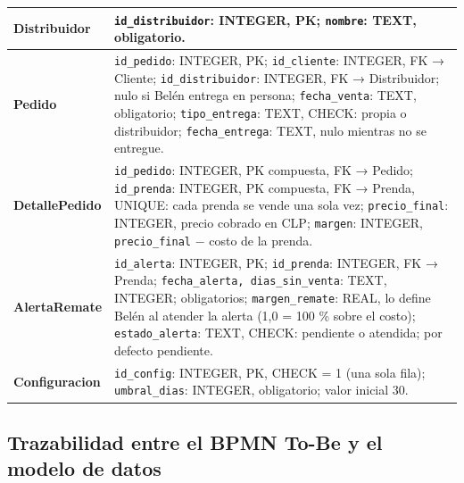 \documentclass[11pt,letterpaper]{article}
\begin{document}
{\begin{longtable}{>{\raggedright\arraybackslash}p{}>{\raggedright\arraybackslash}p{}}
\hline
\textbf{Distribuidor} & \texttt{id\_\allowbreak{}distribuidor}: INTEGER, PK; \texttt{nombre}: TEXT, obligatorio. \\
\hline
\textbf{Pedido} & \texttt{id\_\allowbreak{}pedido}: INTEGER, PK; \texttt{id\_\allowbreak{}cliente}: INTEGER, FK → Cliente; \texttt{id\_\allowbreak{}distribuidor}: INTEGER, FK → Distribuidor; nulo si Belén entrega en persona; \texttt{fecha\_\allowbreak{}venta}: TEXT, obligatorio; \texttt{tipo\_\allowbreak{}entrega}: TEXT, CHECK: propia o distribuidor; \texttt{fecha\_\allowbreak{}entrega}: TEXT, nulo mientras no se entregue. \\
\hline
\textbf{DetallePedido} & \texttt{id\_\allowbreak{}pedido}: INTEGER, PK compuesta, FK → Pedido; \texttt{id\_\allowbreak{}prenda}: INTEGER, PK compuesta, FK → Prenda, UNIQUE: cada prenda se vende una sola vez; \texttt{precio\_\allowbreak{}final}: INTEGER, precio cobrado en CLP; \texttt{margen}: INTEGER, \texttt{precio\_\allowbreak{}final} − costo de la prenda. \\
\hline
\textbf{AlertaRemate} & \texttt{id\_\allowbreak{}alerta}: INTEGER, PK; \texttt{id\_\allowbreak{}prenda}: INTEGER, FK → Prenda; \texttt{fecha\_\allowbreak{}alerta, dias\_\allowbreak{}sin\_\allowbreak{}venta}: TEXT, INTEGER; obligatorios; \texttt{margen\_\allowbreak{}remate}: REAL, lo define Belén al atender la alerta (1,0 = 100 \% sobre el costo); \texttt{estado\_\allowbreak{}alerta}: TEXT, CHECK: pendiente o atendida; por defecto pendiente. \\
\hline
\textbf{Configuracion} & \texttt{id\_\allowbreak{}config}: INTEGER, PK, CHECK = 1 (una sola fila); \texttt{umbral\_\allowbreak{}dias}: INTEGER, obligatorio; valor inicial 30. \\
\hline
\end{longtable}
}


\subsection{Trazabilidad entre el BPMN To-Be y el modelo de datos}
\end{document}
